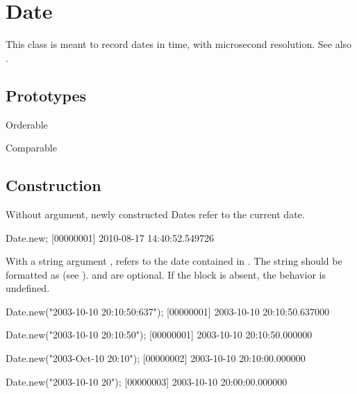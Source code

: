 
\section{Date}

This class is meant to record dates in time, with microsecond resolution.
See also .
\experimental{}

\subsection{Prototypes}
\begin{refObjects}
\item[Orderable]
\item[Comparable]
\end{refObjects}

\subsection{Construction}

Without argument, newly constructed Dates refer to the current date.

\begin{urbiunchecked}[firstnumber=1]
Date.new;
[00000001] 2010-08-17 14:40:52.549726
\end{urbiunchecked}

With a string argument , refers to the date contained in .
The string should be formatted as  (see ).  and
 are optional. If the block  is
absent, the behavior is undefined.

\begin{urbiscript}
Date.new("2003-10-10 20:10:50:637");
[00000001] 2003-10-10 20:10:50.637000

Date.new("2003-10-10 20:10:50");
[00000001] 2003-10-10 20:10:50.000000

Date.new("2003-Oct-10 20:10");
[00000002] 2003-10-10 20:10:00.000000

Date.new("2003-10-10 20");
[00000003] 2003-10-10 20:00:00.000000
\end{urbiscript}

